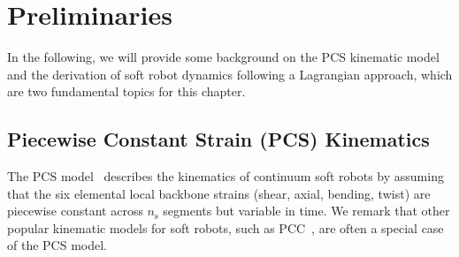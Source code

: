 \section{Preliminaries}
In the following, we will provide some background on the \gls{PCS} kinematic model and the derivation of soft robot dynamics following a Lagrangian approach, which are two fundamental topics for this chapter.

\subsection{Piecewise Constant Strain (PCS) Kinematics}\label{sec:pcsregression:pcs_model}
The \gls{PCS} model~\citep{renda2018discrete} describes the kinematics of continuum soft robots by assuming that the six elemental local backbone strains (shear, axial, bending, twist) are piecewise constant across $n_\mathrm{s}$ segments but variable in time.
We remark that other popular kinematic models for soft robots, such as \gls{PCC}~\citep{webster2010design}, are often a special case of the \gls{PCS} model.

